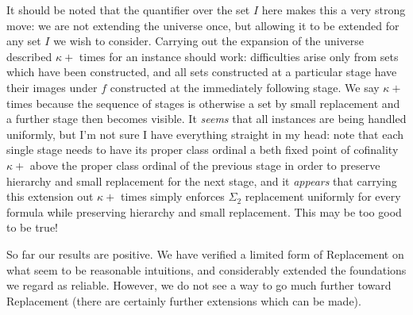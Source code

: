 \documentclass[12pt]{article}
\begin{document}
It should be noted that the quantifier over the set $I$ here makes this a very strong move:  we are not extending the universe once, but allowing it to be extended for any set $I$ we wish to consider.  Carrying out the expansion of the universe described $\kappa+$ times for an instance should work:  difficulties arise only from sets which have been constructed, and all sets constructed at a particular stage have their images under $f$ constructed at the immediately following stage.  We say $\kappa+$ times because the sequence of stages is otherwise a set by small replacement and a further stage then becomes visible.  It {\em seems\/} that all instances are being handled uniformly, but I'm not sure I have everything straight in my head:  note that each single stage needs to have its proper class ordinal a beth fixed point of cofinality $\kappa+$  above the proper class ordinal of the previous stage  in order to preserve hierarchy and small replacement for the next stage, and it {\em appears\/} that carrying this extension out $\kappa+$ times simply enforces $\Sigma_2$ replacement uniformly for every formula while preserving hierarchy and small replacement.  This may be too good to be true!

So far our results are positive.  We have verified a limited form of Replacement on what seem to be reasonable intuitions, and considerably extended the foundations we regard as reliable.  However, we do not see a way to go much further toward Replacement (there are certainly further extensions which can be made).
\end{document}
